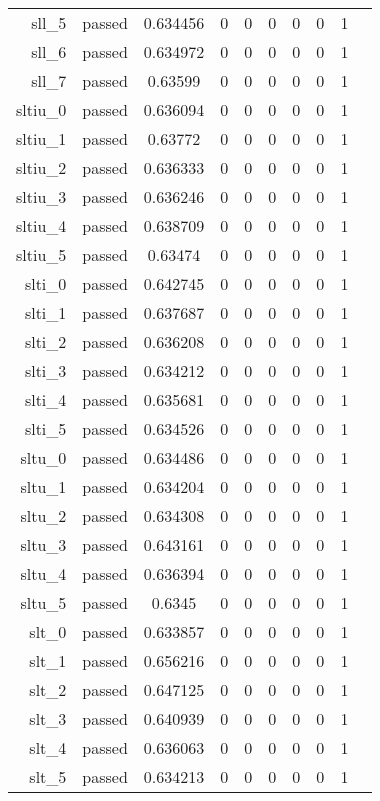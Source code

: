 \begin{longtable}{r|ccccccccc}
    sll\_5 & passed & 0.634456 & 0 & 0 & 0 & 0 & 0 & 1 \\
    sll\_6 & passed & 0.634972 & 0 & 0 & 0 & 0 & 0 & 1 \\
    sll\_7 & passed & 0.63599 & 0 & 0 & 0 & 0 & 0 & 1 \\
    sltiu\_0 & passed & 0.636094 & 0 & 0 & 0 & 0 & 0 & 1 \\
    sltiu\_1 & passed & 0.63772 & 0 & 0 & 0 & 0 & 0 & 1 \\
    sltiu\_2 & passed & 0.636333 & 0 & 0 & 0 & 0 & 0 & 1 \\
    sltiu\_3 & passed & 0.636246 & 0 & 0 & 0 & 0 & 0 & 1 \\
    sltiu\_4 & passed & 0.638709 & 0 & 0 & 0 & 0 & 0 & 1 \\
    sltiu\_5 & passed & 0.63474 & 0 & 0 & 0 & 0 & 0 & 1 \\
    slti\_0 & passed & 0.642745 & 0 & 0 & 0 & 0 & 0 & 1 \\
    slti\_1 & passed & 0.637687 & 0 & 0 & 0 & 0 & 0 & 1 \\
    slti\_2 & passed & 0.636208 & 0 & 0 & 0 & 0 & 0 & 1 \\
    slti\_3 & passed & 0.634212 & 0 & 0 & 0 & 0 & 0 & 1 \\
    slti\_4 & passed & 0.635681 & 0 & 0 & 0 & 0 & 0 & 1 \\
    slti\_5 & passed & 0.634526 & 0 & 0 & 0 & 0 & 0 & 1 \\
    sltu\_0 & passed & 0.634486 & 0 & 0 & 0 & 0 & 0 & 1 \\
    sltu\_1 & passed & 0.634204 & 0 & 0 & 0 & 0 & 0 & 1 \\
    sltu\_2 & passed & 0.634308 & 0 & 0 & 0 & 0 & 0 & 1 \\
    sltu\_3 & passed & 0.643161 & 0 & 0 & 0 & 0 & 0 & 1 \\
    sltu\_4 & passed & 0.636394 & 0 & 0 & 0 & 0 & 0 & 1 \\
    sltu\_5 & passed & 0.6345 & 0 & 0 & 0 & 0 & 0 & 1 \\
    slt\_0 & passed & 0.633857 & 0 & 0 & 0 & 0 & 0 & 1 \\
    slt\_1 & passed & 0.656216 & 0 & 0 & 0 & 0 & 0 & 1 \\
    slt\_2 & passed & 0.647125 & 0 & 0 & 0 & 0 & 0 & 1 \\
    slt\_3 & passed & 0.640939 & 0 & 0 & 0 & 0 & 0 & 1 \\
    slt\_4 & passed & 0.636063 & 0 & 0 & 0 & 0 & 0 & 1 \\
    slt\_5 & passed & 0.634213 & 0 & 0 & 0 & 0 & 0 & 1 \\

\end{longtable}
